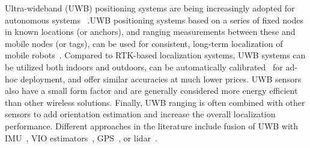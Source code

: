 Ultra-wideband (UWB) positioning systems are being increasingly adopted for autonomous systems ~\cite{yu2021applications}.UWB positioning systems based on a series of fixed nodes in known locations (or anchors), and ranging measurements between these and mobile nodes (or tags), can be used for consistent, long-term localization of mobile robots~\cite{macoir2019uwb, queralta2020uwb}.%
Compared to RTK-based localization systems, UWB systems can be utilized both indoors and outdoors, can be automatically calibrated~\cite{almansa2020autocalibration} for ad-hoc deployment, and offer similar accuracies at much lower prices. UWB sensors also have a small form factor and are generally considered more energy efficient than other wireless solutions. Finally, UWB ranging is often combined with other sensors to add orientation estimation and increase the overall localization performance. Different approaches in the literature include fusion of UWB with IMU~\cite{yao2017integrated}, VIO estimators~\cite{nguyen2019integrated}, GPS~\cite{zhang2019combined}, or lidar~\cite{song2019uwb}.

 

